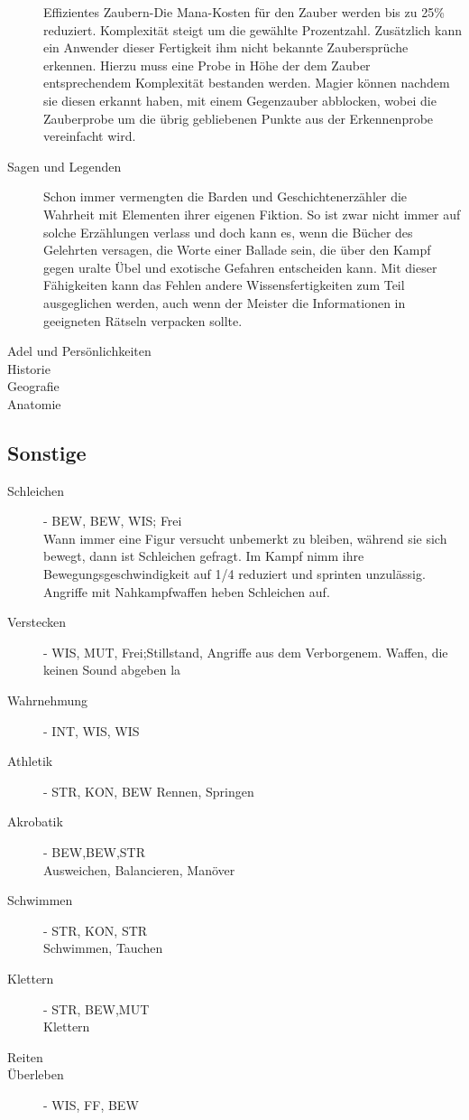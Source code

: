 \documentclass[a4paper,12pt,oneside]{book}
\begin{document}
\begin{description}
Effizientes Zaubern-Die Mana-Kosten für den Zauber werden bis zu 25\% reduziert. Komplexität steigt um die gewählte Prozentzahl.
Zusätzlich kann ein Anwender dieser Fertigkeit ihm nicht bekannte Zaubersprüche erkennen. Hierzu muss eine Probe in Höhe der dem Zauber entsprechendem Komplexität bestanden werden. Magier können nachdem sie diesen erkannt haben, mit einem Gegenzauber abblocken, wobei die Zauberprobe um die übrig gebliebenen Punkte aus der Erkennenprobe vereinfacht wird.
\item[Sagen und Legenden]Schon immer vermengten die Barden und Geschichtenerzähler die Wahrheit mit Elementen ihrer eigenen Fiktion. So ist zwar nicht immer auf solche Erzählungen verlass und doch kann es, wenn die Bücher des Gelehrten versagen, die Worte einer Ballade sein, die über den Kampf gegen uralte Übel und exotische Gefahren entscheiden kann. Mit dieser Fähigkeiten kann das Fehlen andere Wissensfertigkeiten zum Teil ausgeglichen werden, auch wenn der Meister die Informationen in geeigneten Rätseln verpacken sollte.
\item[Adel und Persönlichkeiten]
\item[Historie]
\item[Geografie]
\item[Anatomie]
\end{description}
\subsection{Sonstige}
\begin{description}
\item[Schleichen]- BEW, BEW, WIS; Frei
\\Wann immer eine Figur versucht unbemerkt zu bleiben, während sie sich bewegt, dann ist Schleichen gefragt. Im Kampf nimm ihre Bewegungsgeschwindigkeit auf 1/4 reduziert und sprinten unzulässig. Angriffe mit Nahkampfwaffen heben Schleichen auf.
\item[Verstecken]- WIS, MUT,  Frei;Stillstand, Angriffe aus dem Verborgenem. Waffen, die keinen Sound abgeben la
\item[Wahrnehmung]- INT, WIS, WIS
\item[Athletik]- STR, KON, BEW Rennen, Springen 
\item[Akrobatik]- BEW,BEW,STR
\\Ausweichen, Balancieren, Manöver
\item[Schwimmen]- STR, KON, STR
\\Schwimmen, Tauchen
\item[Klettern]- STR, BEW,MUT
\\Klettern
\item[Reiten]
\item[Überleben]- WIS, FF, BEW
\end{description}
\end{document}
